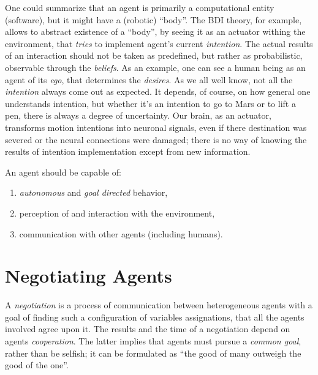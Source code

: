\documentclass[header]{subfiles}
\providecommand{\rootdir}{.}
\begin{document}
\medskip
One could summarize that an agent is primarily a computational entity (software),
but it might have a (robotic) ``body''.
The BDI theory, for example, allows to abstract existence of a ``body'',
by seeing it as an actuator withing the environment, that \emph{tries} to
implement agent's current \emph{intention}.
The actual results of an interaction should not be taken as predefined, but rather
as probabilistic, observable through the \emph{beliefs}. As an example, one can
see a human being as an agent of its \emph{ego}, that determines the \emph{desires}.
As we all well know, not all the \emph{intention} always come out as expected.
It depends, of course, on how general one understands intention, but whether
it's an intention to go to Mars or to lift a pen, there is always a degree of
uncertainty. Our brain, as an actuator, transforms motion intentions into
neuronal signals, even if there destination was severed or the neural connections
were damaged; there is no way of knowing the results of intention implementation
except from new information.

\bigskip

\noindent
An agent should be capable of:
\begin{enumerate}
  \item \emph{autonomous} and \emph{goal directed} behavior,
  \item perception of and interaction with the environment,
  \item communication with other agents (including humans).
\end{enumerate}








\section{Negotiating Agents}
\label{sec:NegotiatingAgents}

A \emph{negotiation} is a process of communication between heterogeneous agents with a
goal of finding such a configuration of variables assignations, that all the
agents involved agree upon it. The results and the time of a negotiation depend
on agents \emph{cooperation}. The latter implies that agents must pursue a
\emph{common goal}, rather than be selfish; it can be formulated as
``the good of many outweigh the good of the one''.
\end{document}
